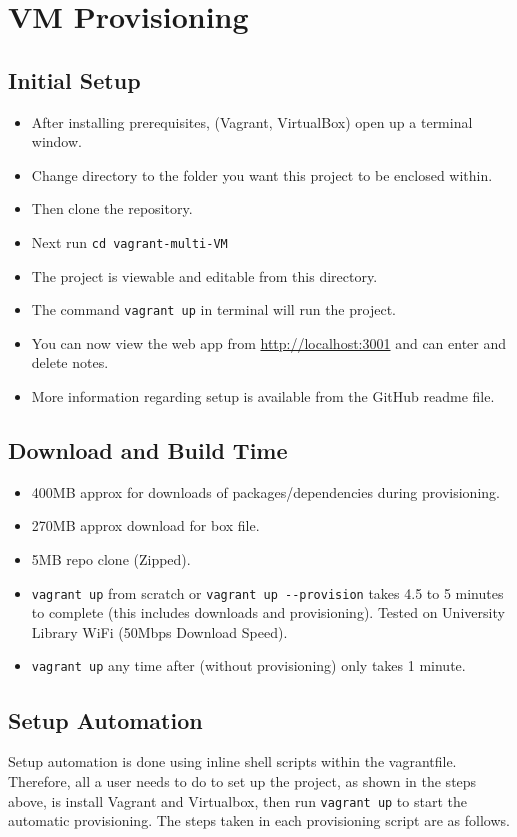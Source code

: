 \documentclass[12pt]{extarticle}
\begin{document}
\section{VM Provisioning}
\subsection{Initial Setup}
\begin{itemize}
\item After installing prerequisites, (Vagrant, VirtualBox) open up a terminal window.
\item Change directory to the folder you want this project to be enclosed within.
\item Then clone the repository.
\item Next run  \lstinline|cd vagrant-multi-VM|
\item The project is viewable and editable from this directory.
\item The command  \lstinline|vagrant up| in terminal will run the project.
\item You can now view the web app from \url{http://localhost:3001} and can enter and delete notes.
\item More information regarding setup is available from the GitHub readme file.
\end{itemize}

\subsection{Download and Build Time}
\begin{itemize}
\item 400MB approx for downloads of packages/dependencies during provisioning.
\item 270MB approx download for box file.
\item 5MB repo clone (Zipped).
\item \lstinline|vagrant up| from scratch or \lstinline|vagrant up --provision| takes 4.5 to 5 minutes to complete (this includes downloads and provisioning). Tested on University Library WiFi (50Mbps Download Speed).
\item  \lstinline|vagrant up| any time after (without provisioning) only takes 1 minute.
\end{itemize}

\subsection{Setup Automation}
Setup automation is done using inline shell scripts within the vagrantfile. Therefore, all a user needs to do to set up the project, as shown in the steps above, is install Vagrant and Virtualbox, then run  \lstinline|vagrant up| to start the automatic provisioning. The steps taken in each provisioning script are as follows.
\end{document}
